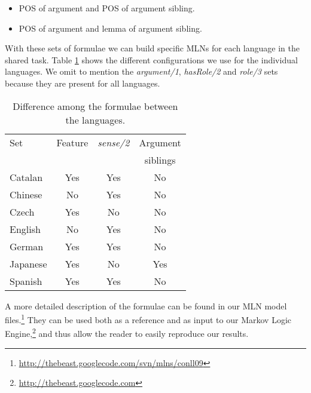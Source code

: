 \begin{itemize}\addtolength{\itemsep}{-0.5\baselineskip}
    \item POS of argument and POS of argument sibling.
    \item POS of argument and lemma of argument sibling.
\end{itemize}

With these sets of formulae we can build specific MLNs for each language in 
the shared task. Table \ref{tbl:diff} shows the different configurations we use for the individual languages. We 
omit to mention the \emph{argument/1}, \emph{hasRole/2} and \emph{role/3} sets because they 
are present for all languages. 


\begin{table}
\begin{center}
\small
\begin{tabular}{|l|c|c|c|}\hline
    Set         & Feature   & \emph{sense/2}  & Argument \\
                &            &        & siblings  \\\hline\hline
Catalan         &   Yes      &  Yes   &  No  \\
Chinese         &   No       &  Yes   &  No  \\
Czech           &   Yes      &  No    &  No  \\
English         &   No       &  Yes   &  No  \\
German          &   Yes      &  Yes   &  No  \\
Japanese        &   Yes      &  No    &  Yes \\
Spanish         &   Yes      &  Yes   &  No  \\
\hline
\end{tabular}
\caption{Difference among the formulae between the languages.}
\label{tbl:diff}
\normalsize
\end{center}
\end{table}

A more detailed description of the formulae can be found in our MLN model files.\footnote{\url{http://thebeast.googlecode.com/svn/mlns/conll09}} They can be 
used both as a reference and as input to our Markov Logic Engine,\footnote{\url{http://thebeast.googlecode.com}} and thus allow the reader 
to easily reproduce our results.



